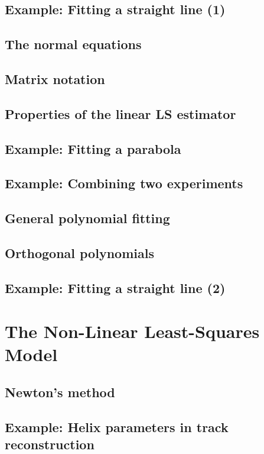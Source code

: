 \documentclass[../main.tex]{subfiles}
\begin{document}
\subsection{Example: Fitting a straight line (1)} \label{sec:10.2.1}
\subsection{The normal equations} \label{sec:10.2.2}
\subsection{Matrix notation} \label{sec:10.2.3}
\subsection{Properties of the linear LS estimator} \label{sec:10.2.4}
\subsection{Example: Fitting a parabola} \label{sec:10.2.5}
\subsection{Example: Combining two experiments} \label{sec:10.2.6}
\subsection{General polynomial fitting} \label{sec:10.2.7}
\subsection{Orthogonal polynomials} \label{sec:10.2.8}
\subsection{Example: Fitting a straight line (2)} \label{sec:10.2.9}

\section{The Non-Linear Least-Squares Model} \label{sec:10.3}
\subsection{Newton's method} \label{sec:10.3.1}
\subsection{Example: Helix parameters in track reconstruction} \label{sec:10.3.2}
\end{document}
